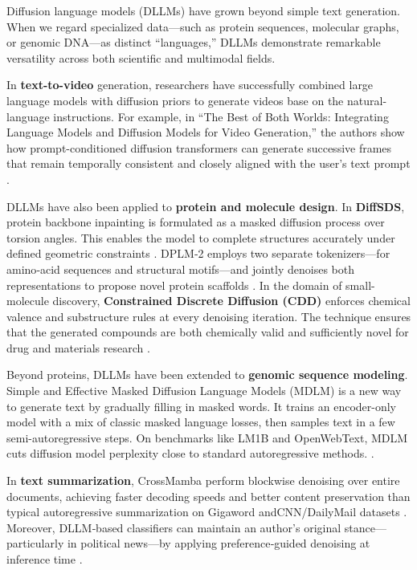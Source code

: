 Diffusion language models (DLLMs) have grown beyond simple text generation. When we regard specialized data—such as protein sequences, molecular graphs, or genomic DNA—as distinct “languages,” DLLMs demonstrate remarkable versatility across both scientific and multimodal fields.


In \textbf{text-to-video} generation, researchers have successfully combined large language models with diffusion priors to generate videos base on the natural-language instructions. For example, in “The Best of Both Worlds: Integrating Language Models and Diffusion Models for Video Generation,” the authors show how prompt-conditioned diffusion transformers can generate successive frames that remain temporally consistent and closely aligned with the user’s text prompt \cite{yin_best_2025}.


DLLMs have also been applied to \textbf{protein and molecule design}. In \textbf{DiffSDS}, protein backbone inpainting is formulated as a masked diffusion process over torsion angles.  This enables the model to complete structures accurately under defined geometric constraints \cite{gao_diffsds_2023}. DPLM‑2 employs two separate tokenizers—for amino‑acid sequences and structural motifs—and jointly denoises both representations to propose novel protein scaffolds \cite{wang_dplm-2_2024}. In the domain of small-molecule discovery, \textbf{Constrained Discrete Diffusion (CDD)} enforces chemical valence and substructure rules at every denoising iteration. The technique ensures that the generated compounds are both chemically valid and sufficiently novel for drug and materials research \cite{cardei_constrained_2025}.


Beyond proteins, DLLMs have been extended to \textbf{genomic sequence modeling}. Simple and Effective Masked Diffusion Language Models (MDLM) is a new way to generate text by gradually filling in masked words. It trains an encoder-only model with a mix of classic masked language losses, then samples text in a few semi-autoregressive steps. On benchmarks like LM1B and OpenWebText, MDLM cuts diffusion model perplexity close to standard autoregressive methods. \cite{sahoo_simple_2024}.


In \textbf{text summarization}, CrossMamba perform blockwise denoising over entire documents, achieving faster decoding speeds and better content preservation than typical autoregressive summarization on Gigaword andCNN/DailyMail datasets \cite{dat_discrete_2025}. Moreover, DLLM‑based classifiers can maintain an author’s original stance—particularly in political news—by applying preference‑guided denoising at inference time \cite{liu_p3sum_2024}.


